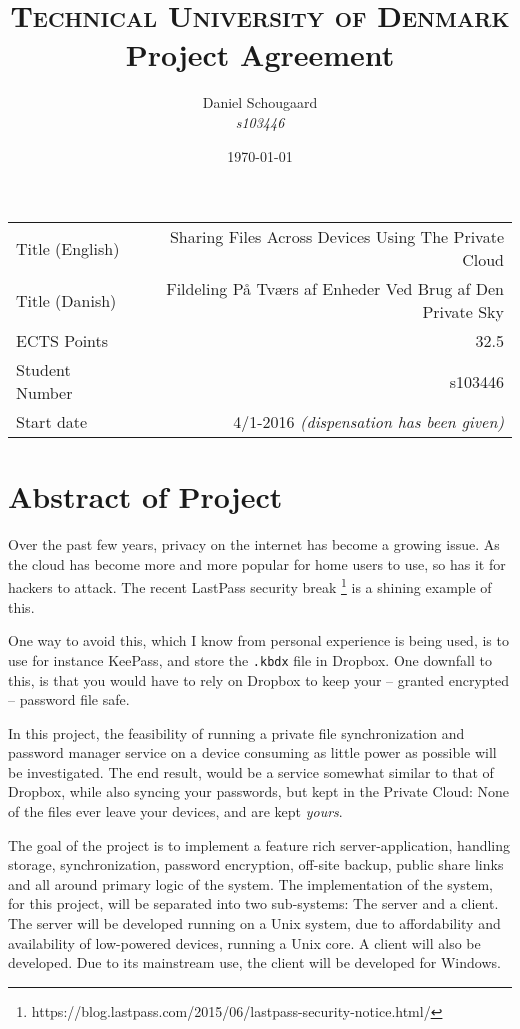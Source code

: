 \documentclass[a4paper,10pt]{article}
\title{	
\textsc{Technical University of Denmark} \\ [25pt] 
\huge Project Agreement
}
\author{Daniel Schougaard \\ \textit{s103446}}
\date{\normalsize\today}
\begin{document}
\maketitle 


\begin{tabular}{ | l | r | }
	Title (English)		&	Sharing Files Across Devices Using The Private Cloud				\\
	Title (Danish)		&	Fildeling På Tværs af Enheder Ved Brug af Den Private Sky			\\
	ECTS Points			&	32.5																\\
	Student Number		&	s103446																\\
	Start date 			&	4/1-2016 \textit{(dispensation has been given)}					\\
\end{tabular}



\section{Abstract of Project}
	Over the past few years, privacy on the internet has become a growing issue. As the cloud has become more and more popular for home users to use, so has it for hackers to attack. The recent LastPass security break \footnote{https://blog.lastpass.com/2015/06/lastpass-security-notice.html/} is a shining example of this.

	One way to avoid this, which I know from personal experience is being used, is to use for instance KeePass, and store the \verb=.kbdx= file in Dropbox. One downfall to this, is that you would have to rely on Dropbox to keep your -- granted encrypted -- password file safe.

	In this project, the feasibility of running a private file synchronization and password manager service on a device consuming as little power as possible will be investigated. The end result, would be a service somewhat similar to that of Dropbox, while also syncing your passwords, but kept in the Private Cloud: None of the files ever leave your devices, and are kept \emph{yours}.

	The goal of the project is to implement a feature rich server-application, handling storage, synchronization, password encryption, off-site backup, public share links and all around primary logic of the system. The implementation of the system, for this project, will be separated into two sub-systems: The server and a client. The server will be developed running on a Unix system, due to affordability and availability of low-powered devices, running a Unix core. A client will also be developed. Due to its mainstream use, the client will be developed for Windows.
\end{document}
